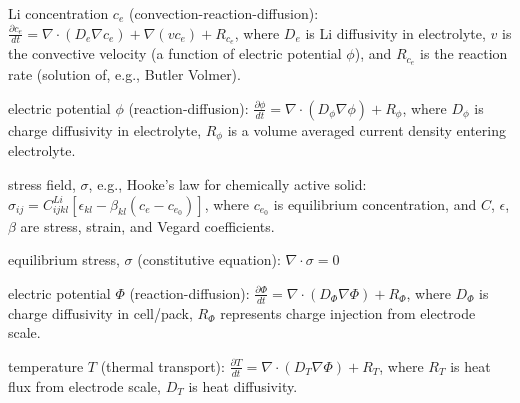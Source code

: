 \documentclass[11pt]{article}
\newcommand{\MarginPar}[1]{\marginpar{%
\vskip-\baselineskip %
\raggedright\tiny\sffamily
\hrule\smallskip{\color{red}#1}\par\smallskip\hrule}}
\begin{document}
\begin{compactitem}
\item
Li concentration $c_e$ (convection-reaction-diffusion): $\frac{\partial c_e}{dt} = \nabla \cdot (D_e \nabla c_e) + \nabla (v c_e) + R_{c_e}$, where $D_e$ is Li diffusivity in electrolyte, $v$ is the 
convective velocity (a function of electric potential $\phi$), and $R_{c_e}$ is the reaction rate (solution of, e.g., Butler
Volmer). 
\item
electric potential $\phi$ (reaction-diffusion): $\frac{\partial \phi}{dt} = \nabla \cdot (D_{\phi} \nabla \phi)  + R_{\phi}$, where $D_{\phi}$ is charge diffusivity in electrolyte, $R_{\phi}$ is a volume averaged current density entering electrolyte.
\item
stress field, $\sigma$, e.g., Hooke's law for chemically active solid: $\sigma_{ij} = C_{ijkl}^{Li} [\epsilon_{kl} - \beta_{kl}(c_e - c_{e_0})] $, where $c_{e_0}$ is equilibrium concentration, and $C$, $\epsilon$, $\beta$ are stress, strain, and Vegard coefficients.
\item
equilibrium stress, $\sigma$ (constitutive equation): $\nabla \cdot \sigma = 0$ 
\end{compactitem}

\begin{compactitem}
\item
electric potential $\Phi$ (reaction-diffusion): $\frac{\partial \Phi}{dt} = \nabla \cdot (D_{\Phi} \nabla \Phi) + R_{\Phi}$,
where $D_{\Phi}$ is charge diffusivity in cell/pack, $R_{\Phi}$ represents charge injection from electrode scale. 
\item
temperature $T$ (thermal transport): $\frac{\partial T}{dt} = \nabla \cdot (D_T \nabla \Phi) + R_T$, where $R_T$ is heat flux from electrode scale, $D_T$ is heat diffusivity.
\end{compactitem}

  
\end{document}
